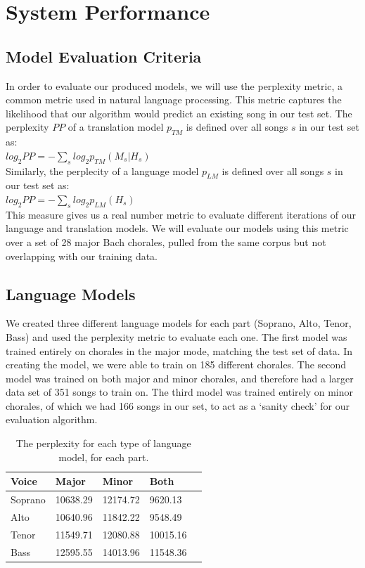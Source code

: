 \documentclass{sig-alternate}
\begin{document}
\section{System Performance}
\label{sec:sys_perform}
\subsection{Model Evaluation Criteria}
In order to evaluate our produced models, we will use the perplexity metric, a common metric used in natural language 
processing. This metric captures the likelihood that our algorithm would predict an existing song in our test set. The perplexity $PP$ \cite{Koehn:2010:SMT:1734086} of a translation model $p_{TM}$ is defined over all songs $s$ in our test set as:\\

$log_2 PP = - \sum_{s} log_2 p_{TM}(M_{s}|H_{s})$\\

Similarly, the perplecity of a language model $p_{LM}$ is defined over all songs $s$ in our test set as:\\

$log_2 PP = - \sum_{s} log_2 p_{LM}(H_{s})$\\

This measure gives us a real number metric to evaluate different iterations of our language and translation models. We will evaluate our models using this metric over a set of 28 major Bach chorales, pulled from the same corpus but not overlapping with our training data.

\subsection{Language Models}
We created three different language models for each part (Soprano, Alto, Tenor, Bass) and used the perplexity metric to evaluate each one. The first model was trained entirely on chorales in the major mode, matching the test set of data. In creating the model, we were able to train on 185 different chorales. The second model was trained on both major and minor chorales, and therefore had a larger data set of 351 songs to train on. The third model was trained entirely on minor chorales, of which we had 166 songs in our set, to act as a `sanity check' for our evaluation algorithm.
\begin{table}[h]
  \begin{center}
      \begin{tabular}{| l | l | l | l | l |}
      \hline
       Voice & Major & Minor & Both \\ \hline
       Soprano &  10638.29 & 12174.72 & 9620.13  \\ \hline
       Alto &  10640.96 & 11842.22 & 9548.49 \\ \hline
       Tenor & 11549.71 & 12080.88 & 10015.16 \\ \hline
       Bass & 12595.55 & 14013.96 & 11548.36 \\ \hline
      \end{tabular}
  \end{center}
  \caption{The perplexity for each type of language model, for each part.}
\end{table}
\end{document}
